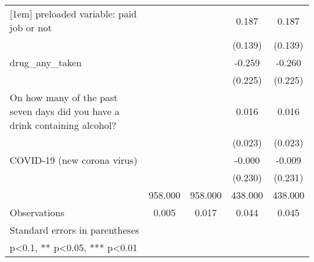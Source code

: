 {\begin{tabular}{l*{4}{c}}
[1em]
preloaded variable: paid job or not&            &            &    0.187   &    0.187   \\
                &            &            &  (0.139)   &  (0.139)   \\
[1em]
drug\_any\_taken  &            &            &   -0.259   &   -0.260   \\
                &            &            &  (0.225)   &  (0.225)   \\
[1em]
On how many of the past seven days did you have a drink containing alcohol?&            &            &    0.016   &    0.016   \\
                &            &            &  (0.023)   &  (0.023)   \\
[1em]
COVID-19 (new corona virus)&            &            &   -0.000   &   -0.009   \\
                &            &            &  (0.230)   &  (0.231)   \\
\hline
\hspace{2mm}    &  958.000   &  958.000   &  438.000   &  438.000   \\
Observations    &    0.005   &    0.017   &    0.044   &    0.045   \\
\hline\hline
\multicolumn{5}{l}{\footnotesize Standard errors in parentheses}\\
\multicolumn{5}{l}{\footnotesize * p<0.1, ** p<0.05, *** p<0.01}\\
\end{tabular}
}
